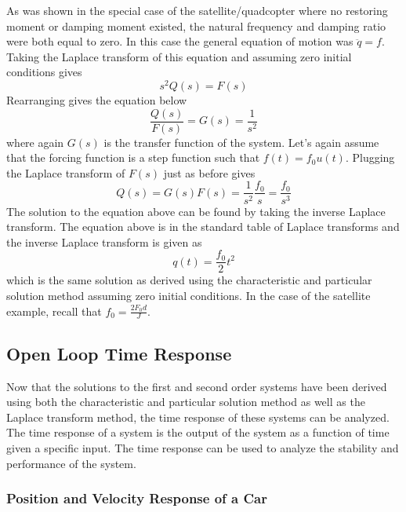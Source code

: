 As was shown in the special case of the satellite/quadcopter where no restoring moment or damping moment existed, the natural frequency and damping ratio were both equal to zero. In this case the general equation of motion was $\ddot{q} = f$. Taking the Laplace transform of this equation and assuming zero initial conditions gives
\begin{equation}
    s^2 Q(s) = F(s)
\end{equation}
Rearranging gives the equation below
\begin{equation}
    \frac{Q(s)}{F(s)} = G(s) = \frac{1}{s^2}
\end{equation}
where again $G(s)$ is the transfer function of the system. Let's again assume that the forcing function is a step function such that $f(t)=f_0u(t)$. Plugging the Laplace transform of $F(s)$ just as before gives
\begin{equation}
    Q(s) = G(s)F(s) = \frac{1}{s^2}\frac{f_0}{s} = \frac{f_0}{s^3}
\end{equation}
The solution to the equation above can be found by taking the inverse Laplace transform. The equation above is in the standard table of Laplace transforms and the inverse Laplace transform is given as 
\begin{equation}
    q(t) = \frac{f_0}{2}t^2
\end{equation}
which is the same solution as derived using the characteristic and particular solution method assuming zero initial conditions. In the case of the satellite example, recall that $f_0 = \frac{2F_0 d}{J}$.

\subsection{Open Loop Time Response}

Now that the solutions to the first and second order systems have been derived using both the characteristic and particular solution method as well as the Laplace transform method, the time response of these systems can be analyzed. The time response of a system is the output of the system as a function of time given a specific input. The time response can be used to analyze the stability and performance of the system. 

\subsubsection{Position and Velocity Response of a Car}

